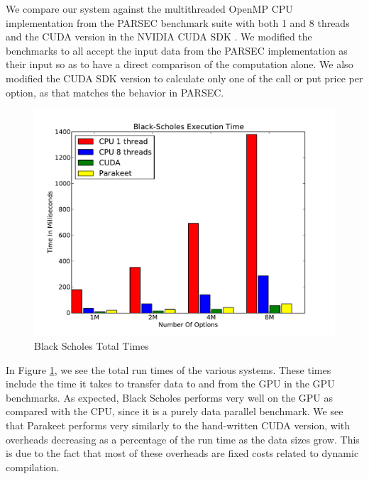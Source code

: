 \documentclass[preprint]{sigplanconf}
\begin{document}
We compare our system against the multithreaded OpenMP CPU implementation from the PARSEC \cite{Bien08} benchmark suite with both 1 and 8 threads and the CUDA version in the NVIDIA CUDA SDK \cite{NvidSD}.  We modified the benchmarks to all accept the input data from the PARSEC implementation as their input so as to have a direct comparison of the computation alone.  We also modified the CUDA SDK version to calculate only one of the call or put price per option, as that matches the behavior in PARSEC.

\begin{figure}[h!]
\includegraphics[scale=0.45]{BSWCPU.pdf}
\caption{Black Scholes Total Times}
\label{BSCPU}
\end{figure}


In Figure \ref{BSCPU}, we see the total run times of the various systems. These times include the time it takes to transfer data to and from the GPU in the GPU benchmarks.  As expected, Black Scholes performs very well on the GPU as compared with the CPU, since it is a purely data parallel benchmark.  We see that Parakeet performs very similarly to the hand-written CUDA version, with overheads decreasing as a percentage of the run time as the data sizes grow.  This is due to the fact that most of these overheads are fixed costs related to dynamic compilation.
\end{document}
